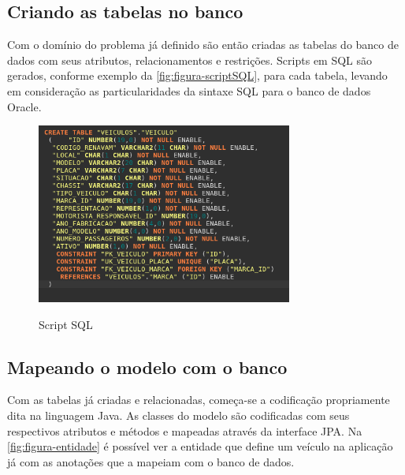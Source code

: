 \subsection{Criando as tabelas no banco}
\label{sbs:desenvolvimentoTabelas}

Com o domínio do problema já definido são então criadas as tabelas do banco de dados com seus atributos, relacionamentos e restrições.
Scripts em SQL são gerados, conforme exemplo da \autoref{fig:figura-scriptSQL}, para cada tabela, levando em consideração as particularidades da sintaxe SQL para o banco de dados Oracle. 

\begin{figure}[!htb]
    \centering
    \caption{Script SQL}
    \includegraphics[width=0.75\textwidth]{dados/figuras/scriptSQL.png}
    \label{fig:figura-scriptSQL}
\end{figure}

\subsection{Mapeando o modelo com o banco}
\label{sbs:desenvolvimentoMapeamento}

Com as tabelas já criadas e relacionadas, começa-se a codificação propriamente dita na linguagem Java. As classes do modelo são codificadas com seus respectivos atributos e métodos e mapeadas através da interface JPA. Na \autoref{fig:figura-entidade} é possível ver a entidade que define um veículo na aplicação já com as anotações que a mapeiam com o banco de dados.


